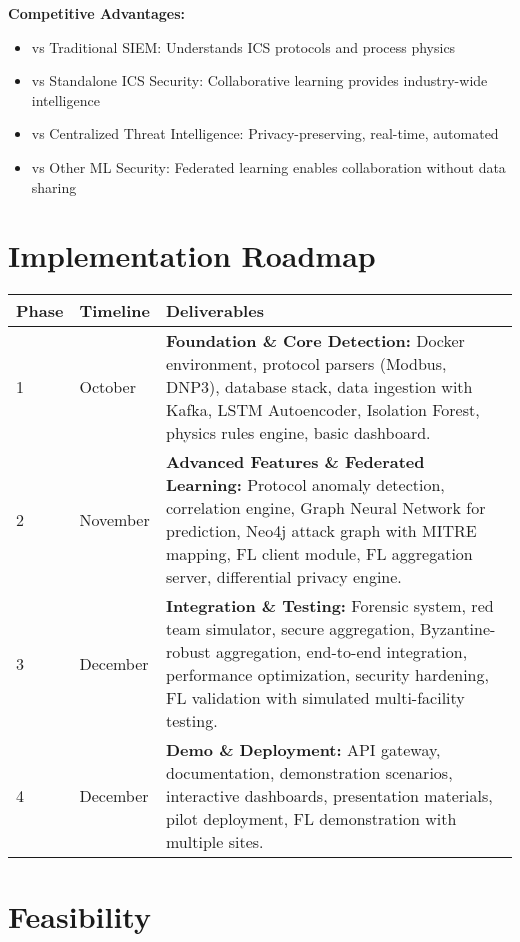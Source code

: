 \documentclass[12pt,a4paper]{article}
\begin{document}
\textbf{Competitive Advantages:}
\begin{itemize}[leftmargin=1cm,itemsep=0pt]
    \item vs Traditional SIEM: Understands ICS protocols and process physics
    \item vs Standalone ICS Security: Collaborative learning provides industry-wide intelligence
    \item vs Centralized Threat Intelligence: Privacy-preserving, real-time, automated
    \item vs Other ML Security: Federated learning enables collaboration without data sharing
\end{itemize}

\section{Implementation Roadmap}

\begin{center}
\begin{tabular}{|p{1.2cm}|p{2cm}|p{10cm}|}
\hline
\textbf{Phase} & \textbf{Timeline} & \textbf{Deliverables}\\
\hline
1 & October  & \textbf{Foundation \& Core Detection:} Docker environment, protocol parsers (Modbus, DNP3), database stack, data ingestion with Kafka, LSTM Autoencoder, Isolation Forest, physics rules engine, basic dashboard.\\
\hline
2 & November & \textbf{Advanced Features \& Federated Learning:} Protocol anomaly detection, correlation engine, Graph Neural Network for prediction, Neo4j attack graph with MITRE mapping, FL client module, FL aggregation server, differential privacy engine.\\
\hline
3 & December & \textbf{Integration \& Testing:} Forensic system, red team simulator, secure aggregation, Byzantine-robust aggregation, end-to-end integration, performance optimization, security hardening, FL validation with simulated multi-facility testing.\\
\hline
4 & December & \textbf{Demo \& Deployment:} API gateway, documentation, demonstration scenarios, interactive dashboards, presentation materials, pilot deployment, FL demonstration with multiple sites.\\
\hline
\end{tabular}
\end{center}

\section{Feasibility}
\end{document}
